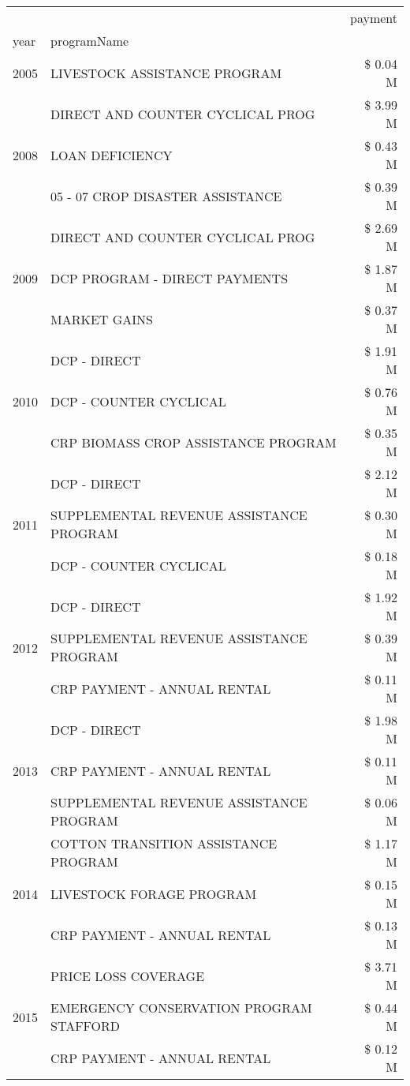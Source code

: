 \begin{tabular}{llr}
\toprule
 &  & payment \\
year & programName &  \\
\midrule
2005 & LIVESTOCK ASSISTANCE PROGRAM & \$ 0.04 M \\
\cline{1-3}
\multirow[t]{3}{*}{2008} & DIRECT AND COUNTER CYCLICAL PROG & \$ 3.99 M \\
 & LOAN DEFICIENCY & \$ 0.43 M \\
 & 05 - 07 CROP DISASTER ASSISTANCE & \$ 0.39 M \\
\cline{1-3}
\multirow[t]{3}{*}{2009} & DIRECT AND COUNTER CYCLICAL PROG & \$ 2.69 M \\
 & DCP PROGRAM - DIRECT PAYMENTS & \$ 1.87 M \\
 & MARKET GAINS & \$ 0.37 M \\
\cline{1-3}
\multirow[t]{3}{*}{2010} & DCP - DIRECT & \$ 1.91 M \\
 & DCP - COUNTER CYCLICAL & \$ 0.76 M \\
 & CRP BIOMASS CROP ASSISTANCE PROGRAM & \$ 0.35 M \\
\cline{1-3}
\multirow[t]{3}{*}{2011} & DCP - DIRECT & \$ 2.12 M \\
 & SUPPLEMENTAL REVENUE ASSISTANCE PROGRAM & \$ 0.30 M \\
 & DCP - COUNTER CYCLICAL & \$ 0.18 M \\
\cline{1-3}
\multirow[t]{3}{*}{2012} & DCP - DIRECT & \$ 1.92 M \\
 & SUPPLEMENTAL REVENUE ASSISTANCE PROGRAM & \$ 0.39 M \\
 & CRP PAYMENT - ANNUAL RENTAL & \$ 0.11 M \\
\cline{1-3}
\multirow[t]{3}{*}{2013} & DCP - DIRECT & \$ 1.98 M \\
 & CRP PAYMENT - ANNUAL RENTAL & \$ 0.11 M \\
 & SUPPLEMENTAL REVENUE ASSISTANCE PROGRAM & \$ 0.06 M \\
\cline{1-3}
\multirow[t]{3}{*}{2014} & COTTON TRANSITION ASSISTANCE PROGRAM & \$ 1.17 M \\
 & LIVESTOCK FORAGE PROGRAM & \$ 0.15 M \\
 & CRP PAYMENT - ANNUAL RENTAL & \$ 0.13 M \\
\cline{1-3}
\multirow[t]{3}{*}{2015} & PRICE LOSS COVERAGE & \$ 3.71 M \\
 & EMERGENCY CONSERVATION PROGRAM STAFFORD & \$ 0.44 M \\
 & CRP PAYMENT - ANNUAL RENTAL & \$ 0.12 M \\

\end{tabular}
